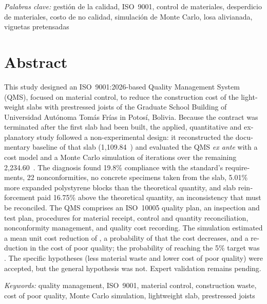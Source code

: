 \emph{Palabras clave:} gestión de la calidad, ISO~9001, control de materiales, desperdicio de materiales, costo de no calidad, simulación de Monte Carlo, losa alivianada, viguetas pretensadas

\chapter*{Abstract}
\begin{otherlanguage}{english}
\noindent This study designed an ISO~9001:2026-based Quality Management System (QMS), focused on material control, to reduce the construction cost of the lightweight slabs with prestressed joists of the Graduate School Building of Universidad Autónoma Tomás Frías in Potosí, Bolivia. Because the contract was terminated after the first slab had been built, the applied, quantitative and explanatory study followed a non-experimental design: it reconstructed the documentary baseline of that slab (1,109.84~\mdos{}) and evaluated the QMS \emph{ex ante} with a cost model and a Monte Carlo simulation of \MCiterEN{} iterations over the remaining 2,234.60~\mdos{}. The diagnosis found 19.8\% compliance with the standard's requirements, 22 nonconformities, no concrete specimens taken from the slab, 5.01\% more expanded polystyrene blocks than the theoretical quantity, and slab reinforcement paid 16.75\% above the theoretical quantity, an inconsistency that must be reconciled. The QMS comprises an ISO~10005 quality plan, an inspection and test plan, procedures for material receipt, control and quantity reconciliation, nonconformity management, and quality cost recording. The simulation estimated a mean unit cost reduction of \rMediaEN{}, a probability of \PRposEN{} that the cost decreases, and a \CNCreduccionPctEN{} reduction in the cost of poor quality; the probability of reaching the 5\% target was \PHGEN{}. The specific hypotheses (less material waste and lower cost of poor quality) were accepted, but the general hypothesis was not. Expert validation remains pending.

\emph{Keywords:} quality management, ISO~9001, material control, construction waste, cost of poor quality, Monte Carlo simulation, lightweight slab, prestressed joists
\end{otherlanguage}
